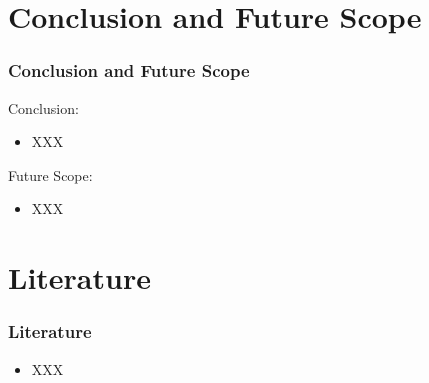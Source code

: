 \documentclass[10pt, a4paper]{beamer}
\begin{document}
	
	
	
	
	
	\section{Conclusion and Future Scope}
	\begin{frame}
		\frametitle{Conclusion and Future Scope}
		
		\begin{block}{Conclusion:}
			\begin{itemize}
				\item XXX
			\end{itemize}
		\end{block}
		
		\begin{block}{Future Scope:}
			\begin{itemize}
				\item XXX
			\end{itemize}
		\end{block}
		
	\end{frame}
	
	
	\section{Literature}
	\begin{frame}
		\frametitle{Literature}
		
		
		\begin{itemize}
			\item XXX
		\end{itemize}
		
	\end{frame}
	
	
	
	
	
\end{document}
